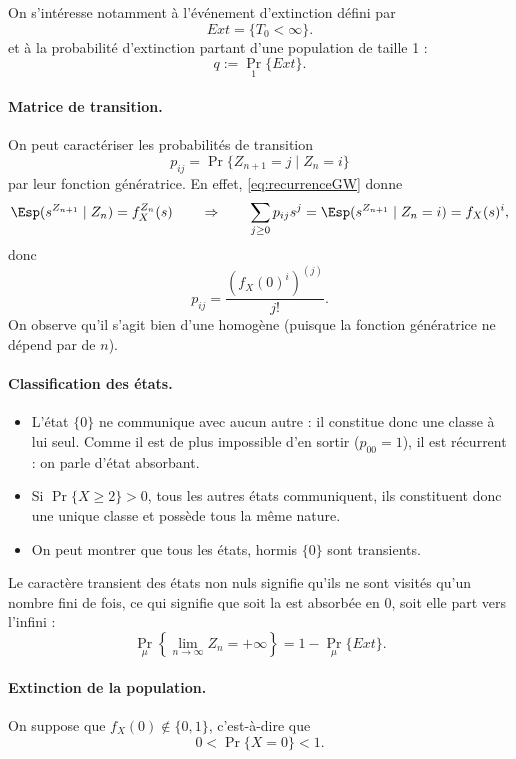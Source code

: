 \bigskip
On s'intéresse notamment à l'événement d'extinction défini par 
$$
Ext = \{T_0 < \infty\}.
$$
et à la probabilité d'extinction partant d'une population de taille 1 : 
$$
q := \Pr_1\{Ext\}.
$$


\paragraph*{Matrice de transition.} 
On peut caractériser les probabilités de transition 
$$
p_{ij} = \Pr\{Z_{n+1} = j \mid Z_n = i\}
$$
par leur fonction génératrice. En effet, \eqref{eq:recurrenceGW} donne
$$
\Esp(s^{Z_{n+1}} \mid Z_n) = f_X^{Z_n}(s)
\qquad \Rightarrow \qquad 
\sum_{j \geq 0} p_{ij} s^j = \Esp(s^{Z_{n+1}} \mid Z_n=i) = f_X(s)^i,
$$
donc
$$
p_{ij} = \frac{\left(f_X(0)^i\right)^{(j)}}{j!}.
$$
On observe qu'il s'agit bien d'une \cM homogène (puisque la fonction génératrice ne dépend par de $n$).

\paragraph*{Classification des états.} 
\begin{itemize}
 \item L'état $\{0\}$ ne communique avec aucun autre : il constitue donc une classe à lui seul. Comme il est de plus impossible d'en sortir ($p_{00} = 1$), il est récurrent : on parle d'état absorbant.
 \item Si $\Pr\{X \geq 2\} > 0$, tous les autres états communiquent, ils constituent donc une unique classe et possède tous la même nature.
 \item On peut montrer que tous les états, hormis $\{0\}$ sont transients.
\end{itemize}

Le caractère transient des états non nuls signifie qu'ils ne sont visités qu'un nombre fini de fois, ce qui signifie que soit la \cM est absorbée en 0, soit elle part vers l'infini : 
$$
\Pr_\mu\left\{ \lim_{n \to \infty} Z_n = + \infty\right\} = 1 - \Pr_\mu\{Ext\}.
$$

\paragraph*{Extinction de la population.} 
On suppose que $f_X(0) \notin \{0, 1\}$, c'est-à-dire que 
$$
0 < \Pr\{X = 0\} < 1.
$$

